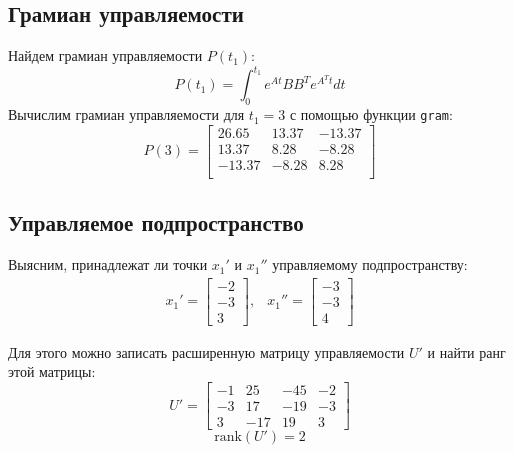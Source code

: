 \subsection{Грамиан управляемости}
Найдем грамиан управляемости $P(t_1)$:
\begin{equation}
    P(t_1) = \int_{0}^{t_1} e^{At}BB^Te^{A^Tt}dt
\end{equation}
Вычислим грамиан управляемости для $t_1 = 3$ с помощью функции \texttt{gram}: 
\begin{equation}
    P(3) = \begin{bmatrix}
        26.65 & 13.37 & -13.37 \\ 
        13.37 & 8.28 & -8.28 \\ 
        -13.37 & -8.28 & 8.28 \\ 
    \end{bmatrix}
\end{equation}

\subsection{Управляемое подпространство}
Выясним, принадлежат ли точки $x_1'$ и $x_1''$ управляемому подпространству:
\begin{equation}
    \begin{array}{cc}
        x_1' = \begin{bmatrix}
            -2 \\
            -3 \\
            3
        \end{bmatrix}, &
        x_1'' = \begin{bmatrix}
            -3 \\
            -3 \\
            4
        \end{bmatrix}
    \end{array}
\end{equation}

Для этого можно записать расширенную матрицу управляемости $U'$ и найти ранг этой матрицы:
\begin{equation}
    U' = \begin{bmatrix}
        -1 & 25 & -45 & -2 \\
        -3 & 17 & -19 & -3 \\
        3 & -17 & 19 & 3
    \end{bmatrix}
\end{equation}
\begin{equation}
    \text{rank}(U') = 2
\end{equation}

